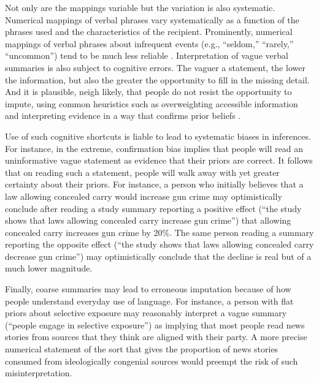 \documentclass[12pt]{article}
\begin{document}
Not only are the mappings variable but the variation is also systematic. Numerical mappings of verbal phrases vary systematically as a function of the phrases used and the characteristics of the recipient. Prominently, numerical mappings of verbal phrases about infrequent events (e.g., ``seldom,'' ``rarely,'' ``uncommon'') tend to be much less reliable \citep{wallsten1986base}. Interpretation of vague verbal summaries is also subject to cognitive errors. The vaguer a statement, the lower the information, but also the greater the opportunity to fill in the missing detail. And it is plausible, neigh likely, that people do not resist the opportunity to impute, using common heuristics such as overweighting accessible information and interpreting evidence in a way that confirms prior beliefs \citep{nickerson1998confirmation, tomz2009electoral, brun1988verbal, wright1994much}.

Use of such cognitive shortcuts is liable to lead to systematic biases in inferences. For instance, in the extreme, confirmation bias implies that people will read an uninformative vague statement as evidence that their priors are correct. It follows that on reading such a statement, people will walk away with yet greater certainty about their priors. For instance, a person who initially believes that a law allowing concealed carry would increase gun crime may optimistically conclude after reading a study summary reporting a positive effect (``the study shows that laws allowing concealed carry increase gun crime'') that allowing concealed carry increases gun crime by 20\%. The same person reading a summary reporting the opposite effect (``the study shows that laws allowing concealed carry decrease gun crime'') may optimistically conclude that the decline is real but of a much lower magnitude. 

Finally, coarse summaries may lead to erroneous imputation because of how people understand everyday use of language. For instance, a person with flat priors about selective exposure may reasonably interpret a vague summary (``people engage in selective exposure'') as implying that most people read news stories from sources that they think are aligned with their party. A more precise numerical statement of the sort that gives the proportion of news stories consumed from ideologically congenial sources would preempt the risk of such misinterpretation. 
\end{document}
